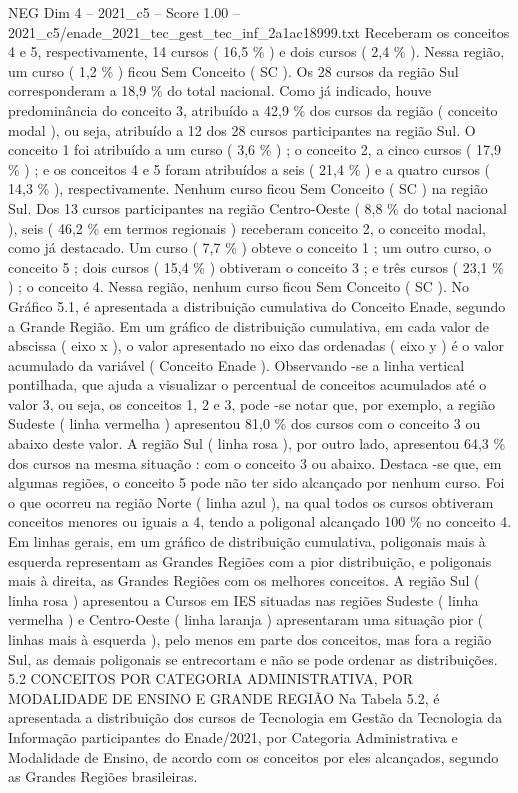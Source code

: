 \begin{textsample}{NEG Dim 4 – 2021\_c5 – Score 1.00 – 2021\_c5/enade\_2021\_tec\_gest\_tec\_inf\_2a1ac18999.txt}
Receberam os conceitos 4 e 5, respectivamente, 14 cursos ( 16,5 \% ) e dois cursos ( 2,4 \% ).
Nessa região, um curso ( 1,2 \% ) ficou Sem Conceito ( SC ).
Os 28 cursos da região Sul corresponderam a 18,9 \% do total nacional.
Como já indicado, houve predominância do conceito 3, atribuído a 42,9 \% dos cursos da região ( conceito modal ), ou seja, atribuído a 12 dos 28 cursos participantes na região Sul.
O conceito 1 foi atribuído a um curso ( 3,6 \% ) ; o conceito 2, a cinco cursos ( 17,9 \% ) ; e os conceitos 4 e 5 foram atribuídos a seis ( 21,4 \% ) e a quatro cursos ( 14,3 \% ), respectivamente.
Nenhum curso ficou Sem Conceito ( SC ) na região Sul.
Dos 13 cursos participantes na região Centro-Oeste ( 8,8 \% do total nacional ), seis ( 46,2 \% em termos regionais ) receberam conceito 2, o conceito modal, como já destacado.
Um curso ( 7,7 \% ) obteve o conceito 1 ; um outro curso, o conceito 5 ; dois cursos ( 15,4 \% ) obtiveram o conceito 3 ; e três cursos ( 23,1 \% ) ; o conceito 4.
Nessa região, nenhum curso ficou Sem Conceito ( SC ).
No Gráfico 5.1, é apresentada a distribuição cumulativa do Conceito Enade, segundo a Grande Região.
Em um gráfico de distribuição cumulativa, em cada valor de abscissa ( eixo x ), o valor apresentado no eixo das ordenadas ( eixo y ) é o valor acumulado da variável ( Conceito Enade ).
Observando -se a linha vertical pontilhada, que ajuda a visualizar o percentual de conceitos acumulados até o valor 3, ou seja, os conceitos 1, 2 e 3, pode -se notar que, por exemplo, a região Sudeste ( linha vermelha ) apresentou 81,0 \% dos cursos com o conceito 3 ou abaixo deste valor.
A região Sul ( linha rosa ), por outro lado, apresentou 64,3 \% dos cursos na mesma situação : com o conceito 3 ou abaixo.
Destaca -se que, em algumas regiões, o conceito 5 pode não ter sido alcançado por nenhum curso.
Foi o que ocorreu na região Norte ( linha azul ), na qual todos os cursos obtiveram conceitos menores ou iguais a 4, tendo a poligonal alcançado 100 \% no conceito 4.
Em linhas gerais, em um gráfico de distribuição cumulativa, poligonais mais à esquerda representam as Grandes Regiões com a pior distribuição, e poligonais mais à direita, as Grandes Regiões com os melhores conceitos.
A região Sul ( linha rosa ) apresentou a Cursos em IES situadas nas regiões Sudeste ( linha vermelha ) e Centro-Oeste ( linha laranja ) apresentaram uma situação pior ( linhas mais à esquerda ), pelo menos em parte dos conceitos, mas fora a região Sul, as demais poligonais se entrecortam e não se pode ordenar as distribuições. 5.2 CONCEITOS POR CATEGORIA ADMINISTRATIVA, POR MODALIDADE DE ENSINO E GRANDE REGIÃO Na Tabela 5.2, é apresentada a distribuição dos cursos de Tecnologia em Gestão da Tecnologia da Informação participantes do Enade/2021, por Categoria Administrativa e Modalidade de Ensino, de acordo com os conceitos por eles alcançados, segundo as Grandes Regiões brasileiras.

\end{textsample}
